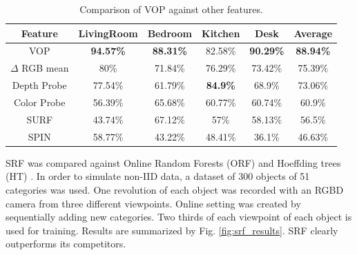 \documentclass{llncs}
\begin{document}
\begin{table}[!ht]	
 \center
 \caption{Comparison of VOP against other features.}
 \begin{tabular}{c|c|c|c|c|c}
  \textbf{Feature} & \textbf{LivingRoom} & \textbf{Bedroom} & \textbf{Kitchen} & \textbf{Desk} & \textbf{Average} \\ \hline
  VOP & \textbf{94.57\%} & \textbf{88.31\%} & 82.58\% & \textbf{90.29\%} & \textbf{88.94\%} \\
  $\Delta$ RGB mean & 80\% & 71.84\% & 76.29\% & 73.42\% & 75.39\% \\
  Depth Probe& 77.54\% & 61.79\% & \textbf{84.9\%} & 68.9\% & 73.06\% \\
  Color Probe& 56.39\% & 65.68\% & 60.77\% & 60.74\% & 60.9\% \\
  SURF & 43.74\% & 67.12\% & 57\% & 58.13\% & 56.5\% \\
  SPIN & 58.77\% & 43.22\% & 48.41\% & 36.1\% & 46.63\% \\
 \end{tabular}
 \label{fig:vop_results}
\end{table}

  SRF was compared against Online Random Forests (ORF) \cite{online_forest} and Hoeffding trees (HT) \cite{htree}. In order to simulate non-IID data, a dataset of 300 objects of 51 categories \cite{dataset} was used. One revolution of each object was recorded with an RGBD camera from three different viewpoints. Online setting was created by sequentially adding new categories. Two thirds of each viewpoint of each object is used for training. Results are summarized by Fig. \ref{fig:srf_results}. SRF clearly outperforms its competitors.
 
\end{document}

